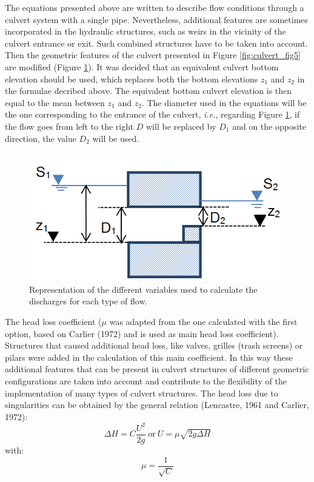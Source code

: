 The equations presented above are written to describe flow conditions through a 
culvert system with a single pipe. 
Nevertheless, additional features are sometimes incorporated in the hydraulic structures, 
such as weirs in the vicinity of the culvert entrance or exit. 
Such combined structures have to be taken into account. 
Then the geometric features of the culvert presented in Figure \ref{fig:culvert_fig5} 
are modified (Figure \ref{fig:culvert_fig6}). 
It was decided that an equivalent culvert bottom elevation should be used, 
which replaces both the bottom elevations $z_1$ and $z_2$ in the formulae decribed above. 
The equivalent bottom culvert elevation is then equal to the mean between $z_1$ and $z_2$. 
The diameter used in the equations will be the one corresponding to the entrance of the culvert, 
\textit{i.e.}, regarding Figure \ref{fig:culvert_fig6}, if the flow goes from left 
to the right $D$ will be replaced by $D_1$ and on the opposite direction, 
the value $D_2$ will be used.

\begin{figure}[H]
\begin{center}
  \includegraphics[scale=0.5]{culvert_fig6.png}
\end{center}
\caption{Representation of the different variables used to 
calculate the discharges for each type of flow.}
\label{fig:culvert_fig6}
\end{figure}

The head loss coefficient ($\mu$ was adapted from the one calculated with the first option, 
based on Carlier (1972) and is used as main head loss coefficient). 
Structures that caused additional head loss, like valves, grilles (trash screens) or pilars 
were added in the calculation of this main coefficient. 
In this way these additional features that can be present in culvert structures of 
different geometric configurations are taken into account and contribute to 
the flexibility of the implementation of many types of culvert structures.
The head loss due to singularities can be obtained by the general 
relation (Lencastre, 1961 and Carlier, 1972):
\begin{equation}
\Delta H = C \dfrac{U^2}{2g} ~\text{or}~  U = \mu \sqrt{2g\Delta H}
\end{equation}
with:
\begin{equation}
\mu =\dfrac{1}{\sqrt{C}}
\end{equation}

